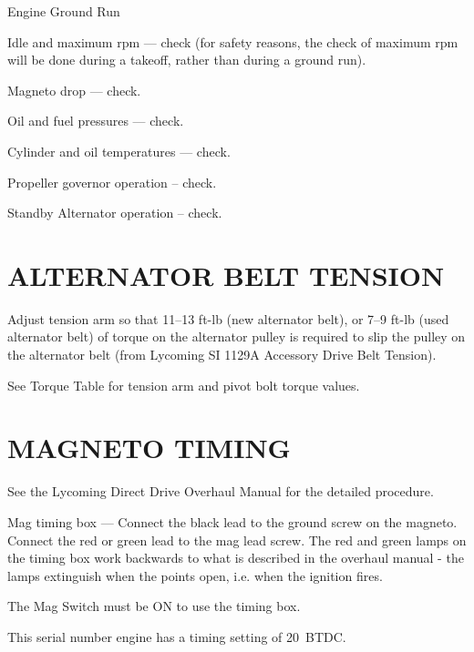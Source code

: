 \begin{enumerate*}
	\item{Engine Ground Run}
	\begin{enumerate*}
		\item Idle and maximum rpm --- check (for safety reasons, the check of maximum rpm will be done during a takeoff, rather than during a ground run).
		\item Magneto drop --- check.
		\item Oil and fuel pressures --- check.
		\item Cylinder and oil temperatures --- check.
		\item Propeller governor operation -- check.
		\item Standby Alternator operation -- check.
	\end{enumerate*}

\end{enumerate*}

\section{ALTERNATOR BELT TENSION} 
\begin{enumerate*}
	\item Adjust tension arm so that 11--13 ft-lb (new alternator belt), or 7--9 ft-lb (used alternator belt) of torque on the alternator pulley is required to slip the pulley on the alternator belt (from Lycoming SI 1129A Accessory Drive Belt Tension). 
	\item See Torque Table for tension arm and pivot bolt torque values. 
\end{enumerate*}

\section{MAGNETO TIMING} 
\begin{enumerate*}
	\item See the Lycoming Direct Drive Overhaul Manual for the detailed procedure. 
	\item Mag timing box --- Connect the black lead to the ground screw on the magneto.  Connect the red or green lead to the mag lead screw.  The red and green lamps on the timing box work backwards to what is described in the overhaul manual - the lamps extinguish when the points open, i.e. when the ignition fires. 
	\item The Mag Switch must be ON to use the timing box. 
	\item This serial number engine has a timing setting of 20\textdegree ~BTDC. 
	
\end{enumerate*}

